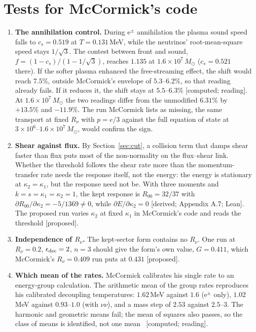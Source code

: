 \documentclass[11pt]{article}
\newcommand{\grade}[1]{\textsf{\small[#1]}}
\begin{document}
\section{Tests for McCormick's code}

\begin{enumerate}
\item \textbf{The annihilation control.} During e$^\pm$ annihilation the plasma sound speed falls to $c_s=0.519$ at $T=0.131$\,MeV, while the neutrinos' root-mean-square speed stays $1/\sqrt3$. The contest between front and sound, $f=(1-c_s)/(1-1/\sqrt3)$, reaches $1.135$ at $1.6\times10^7\,M_\odot$ ($c_s=0.521$ there). If the softer plasma enhanced the free-streaming effect, the shift would reach $7.5\%$, outside McCormick's envelope of $5.3$--$6.2\%$, so that reading already fails. If it reduces it, the shift stays at $5.5$--$6.3\%$ \grade{computed; reading}. At $1.6\times10^7\,M_\odot$ the two readings differ from the unmodified $6.31\%$ by $+13.5\%$ and $-11.9\%$. The run McCormick lists as missing, the same transport at fixed $R_\nu$ with $p=e/3$ against the full equation of state at $3\times10^6$--$1.6\times10^7\,M_\odot$, would confirm the sign.
\item \textbf{Shear against flux.} By Section~\ref{sec:cut}, a collision term that damps shear faster than flux puts most of the non-normality on the flux--shear link. Whether the threshold follows the shear rate more than the momentum-transfer rate needs the response itself, not the energy: the energy is stationary at $\kappa_2=\kappa_1$, but the response need not be. With three moments and $k=s=\kappa_1=\kappa_2=1$, the kept response is $R_{00}=32/37$ with $\partial R_{00}/\partial\kappa_2=-5/1369\neq0$, while $\partial E/\partial\kappa_2=0$ \grade{derived; Appendix A.7; Lean}. The proposed run varies $\kappa_2$ at fixed $\kappa_1$ in McCormick's code and reads the threshold \grade{proposed}.
\item \textbf{Independence of $R_\nu$.} The kept-sector form contains no $R_\nu$. One run at $R_\nu=0.2$, $\epsilon_{\rm dec}=2$, $n=3$ should give the form's own value, $G=0.411$, which McCormick's $R_\nu=0.409$ run puts at $0.431$ \grade{proposed}.
\item \textbf{Which mean of the rates.} McCormick calibrates his single rate to an energy-group calculation. The arithmetic mean of the group rates reproduces his calibrated decoupling temperatures: $1.62$\,MeV against $1.6$ (e$^\pm$ only), $1.02$\,MeV against $0.93$--$1.0$ (with $\nu\nu$), and a mass step of $2.53$ against $2.5$--$3$. The harmonic and geometric means fail; the mean of squares also passes, so the class of means is identified, not one mean~\cite{WB} \grade{computed; reading}.
\end{enumerate}
\end{document}
